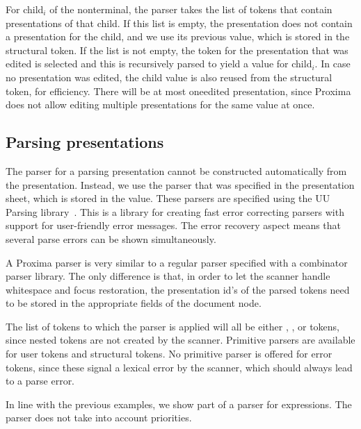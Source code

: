 \documentclass[12pt]{article}
\begin{document}
For child$_i$ of the nonterminal, the parser takes the list of tokens that contain presentations of that child. If this list is empty, the presentation does not contain a presentation for the child, and we use its previous value, which is stored in the structural token. If the list is not empty, the token for the presentation that was edited is selected and this is recursively parsed to yield a value for child$_i$. In case no presentation was edited, the child value is also reused from the structural token, for efficiency. There will be at most oneedited presentation, since Proxima does not allow editing multiple presentations for the same value at once. 




\subsection{Parsing presentations}

The parser for a parsing presentation cannot be constructed automatically from the presentation. Instead, we use the parser that was specified in the presentation sheet, which is stored in the  value. These parsers are specified using the UU Parsing library~\cite{swierstra03polishParsers, swierstra08parserCombinators}. This is a library for creating fast error correcting parsers with support for user-friendly error messages. The error recovery aspect means that several parse errors can be shown simultaneously.

A Proxima parser is very similar to a regular parser specified with a combinator parser library. The only difference is that, in order to let the scanner handle whitespace and focus restoration, the presentation id's of the parsed tokens need to be stored in the appropriate fields of the document node. 

The list of tokens to which the parser is applied will all be either , , or  tokens, since nested  tokens are not created by the scanner. Primitive parsers are available for user tokens and structural tokens. No primitive parser is offered for error tokens, since these signal a lexical error by the scanner, which should always lead to a parse error.

In line with the previous examples, we show part of a parser for expressions. The parser does not take into account priorities.
\end{document}
